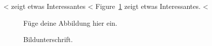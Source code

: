 \<%

\begin{WSample}
<%
 zeigt etwas Interessantes
<%
Figure~\ref{fig:label} zeigt etwas Interessantes.
<%

\begin{figure}
  \centering
  Füge deine Abbildung hier ein.
  \caption{Bildunterschrift.}
  \label{fig:label}
\end{figure}
\end{WSample}
\PexaShowBoth{}
